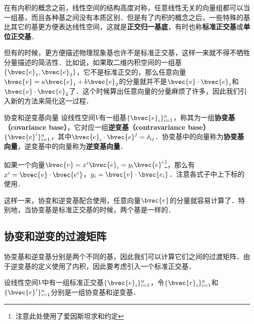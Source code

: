 

在有内积的概念之前，线性空间的结构高度对称，任意线性无关的向量组都可以当一组基，而且各种基之间没有本质区别．但是有了内积的概念之后，一些特殊的基比其它的基更方便表达线性空间，这就是\textbf{正交归一基底}，有时也称\textbf{标准正交基}或\textbf{单位正交基}．

但有的时候，更方便描述物理现象基也许不是标准正交基，这样一来就不得不牺牲分量描述的简洁性．比如说，如果取二维内积空间的一组基$\{\bvec{e}_1, \bvec{e}_2\}$，它不是标准正交的，那么任意向量$\bvec{v}=a\bvec{e}_1+b\bvec{e}_2$的分量就并不是$\bvec{v}\cdot\bvec{e}_1$和$\bvec{v}\cdot\bvec{e}_2$了．这个时候算出任意向量的分量麻烦了许多，因此我们引入新的方法来简化这一过程．

\begin{definition}{协变和逆变基向量}
设线性空间$V$有一组基$\{\bvec{e}_i\}_{i=1}^n$，称其为一组\textbf{协变基（covariance base）}，它对应一组\textbf{逆变基（contravariance base）}$\{\bvec{e}^i\}_{i=1}^n$，其中$\bvec{e}_i\cdot\bvec{e}^j=\delta_{ij}$．协变基中的向量称为\textbf{协变基向量}，逆变基中的向量称为\textbf{逆变基向量}．
\end{definition}

如果一个向量$\bvec{v}=x^i\bvec{e}_i=y_i\bvec{e}^i$\footnote{注意此处使用了爱因斯坦求和约定}，那么有$x^i=\bvec{v}\cdot\bvec{e^i}$，$y_i=\bvec{v}\cdot\bvec{e_i}$．注意各式子中上下标的使用．

这样一来，协变和逆变基配合使用，任意向量$\bvec{v}$的分量就容易计算了．特别地，当协变基是标准正交基的时候，两个基是一样的．

\subsection{协变和逆变的过渡矩阵}

协变基和逆变基分别是两个不同的基，因此我们可以计算它们之间的过渡矩阵．由于逆变基的定义使用了内积，因此要考虑引入一个标准正交基．

设线性空间$V$中有一组标准正交基$\{\bvec{e}_i\}^n_{i=1}$，令$\{\bvec{r}_i\}^n_{i=1}$和$\{\bvec{r}^i\}^n_{i=1}$分别是一组协变基和逆变基．




